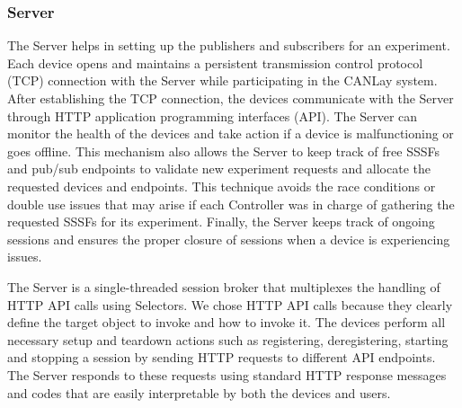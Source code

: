 \documentclass[letterpaper,twocolumn,12pt]{article}
\begin{document}
\subsubsection{Server}
The Server helps in setting up the publishers and subscribers for an experiment. Each device opens and maintains a persistent transmission control protocol (TCP) connection with the Server while participating in the CANLay system. 
After establishing the TCP connection, the devices communicate with the Server through HTTP application programming interfaces (API). 
The Server can monitor the health of the devices and take action if a device is malfunctioning or goes offline. 
This mechanism also allows the Server to keep track of free SSSFs and pub/sub endpoints to validate new experiment requests and allocate the requested devices and endpoints. This technique avoids the race conditions or double use issues that may arise if each Controller was in charge of gathering the requested SSSFs for its experiment. 
Finally, the Server keeps track of ongoing sessions and ensures the proper closure of sessions when a device is experiencing issues.

The Server is a single-threaded session broker that multiplexes the handling of HTTP API calls using Selectors. 
We chose HTTP API calls because they clearly define the target object to invoke and how to invoke it. The devices perform all necessary setup and teardown actions such as registering, deregistering, starting and stopping a session by sending HTTP requests to different API endpoints. 
The Server responds to these requests using standard HTTP response messages and codes that are easily interpretable by both the devices and users.
\end{document}
